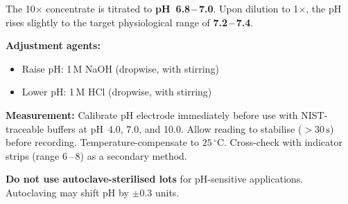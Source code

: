 \documentclass[10pt,a4paper]{article}
\begin{document}
\begin{minipage}[t]{0.44\linewidth}
  \begin{tcolorbox}[goldbox, title={\faExclamationTriangle\enskip pH Adjustment Note}]
    \small\color{NexaText}
    The 10$\times$ concentrate is titrated to \textbf{pH~6.8\,--\,7.0}. Upon
    dilution to 1$\times$, the pH rises slightly to the target physiological
    range of \textbf{7.2\,--\,7.4}.

    \medskip
    \textbf{Adjustment agents:}
    \begin{itemize}[leftmargin=4mm, itemsep=1pt, topsep=1pt]
      \item Raise pH: 1\,M NaOH (dropwise, with stirring)
      \item Lower pH: 1\,M HCl (dropwise, with stirring)
    \end{itemize}

    \medskip
    \textbf{Measurement:} Calibrate pH electrode immediately before use
    with NIST-traceable buffers at pH~4.0, 7.0, and 10.0. Allow
    reading to stabilise ($>30\,\text{s}$) before recording. Temperature-compensate
    to $25\,^{\circ}$C. Cross-check with indicator strips (range 6\,--\,8)
    as a secondary method.

    \medskip
    \begin{tcolorbox}[warnbox]
      {\color{NexaWarn}\faExclamationCircle}\enskip
      {\bfseries\color{NexaWarn} Do not use autoclave-sterilised lots}
      for pH-sensitive applications. Autoclaving may shift pH by
      $\pm0.3$ units.
    \end{tcolorbox}
  \end{tcolorbox}
\end{minipage}

\vspace{5mm}
\end{document}
